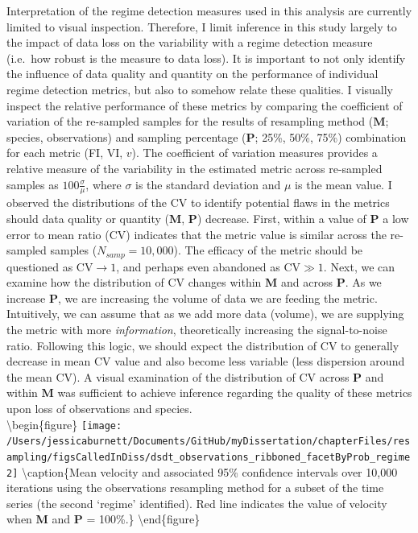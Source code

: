 \documentclass[12pt,twoside,openany]{reedthesis}
\begin{document}
Interpretation of the regime detection measures used in this analysis are currently limited to visual inspection. Therefore, I limit inference in this study largely to the impact of data loss on the variability with a regime detection measure (i.e.~how robust is the measure to data loss). It is important to not only identify the influence of data quality and quantity on the performance of individual regime detection metrics, but also to somehow relate these qualities. I visually inspect the relative performance of these metrics by comparing the coefficient of variation of the re-sampled samples for the results of resampling method (\(\textbf{M}\); species, observations) and sampling percentage (\(\textbf{P}\); 25\%, 50\%, 75\%) combination for each metric (FI, VI, \(v\)). The coefficient of variation measures provides a relative measure of the variability in the estimated metric across re-sampled samples as \(100\frac{\sigma}{\mu}\), where \(\sigma\) is the standard deviation and \(\mu\) is the mean value.
I observed the distributions of the CV to identify potential flaws in the metrics should data quality or quantity (\(\textbf{M}\), \(\textbf{P}\)) decrease. First, within a value of \(\textbf{P}\) a low error to mean ratio (CV) indicates that the metric value is similar across the re-sampled samples (\(N_{samp}=10,000\)). The efficacy of the metric should be questioned as CV\(\rightarrow 1\), and perhaps even abandoned as CV\(\gg1\). Next, we can examine how the distribution of CV changes within \(\textbf{M}\) and across \(\textbf{P}\). As we increase \(\textbf{P}\), we are increasing the volume of data we are feeding the metric. Intuitively, we can assume that as we add more data (volume), we are supplying the metric with more \emph{information}, theoretically increasing the signal-to-noise ratio. Following this logic, we should expect the distribution of CV to generally decrease in mean CV value and also become less variable (less dispersion around the mean CV). A visual examination of the distribution of CV across \(\textbf{P}\) and within \(\textbf{M}\) was sufficient to achieve inference regarding the quality of these metrics upon loss of observations and species.\\
\newpage
\textbackslash begin\{figure\}
\texttt{[image: /Users/jessicaburnett/Documents/GitHub/myDissertation/chapterFiles/resampling/figsCalledInDiss/dsdt\_observations\_ribboned\_facetByProb\_regime2]} \textbackslash caption\{Mean velocity and associated 95\% confidence intervals over 10,000 iterations using the observations resampling method for a subset of the time series (the second `regime' identified). Red line indicates the value of velocity when \textbf{M} and \textbf{P} = 100\%.\}\label{fig:dsdtResampRegime2}
\textbackslash end\{figure\}
\end{document}
